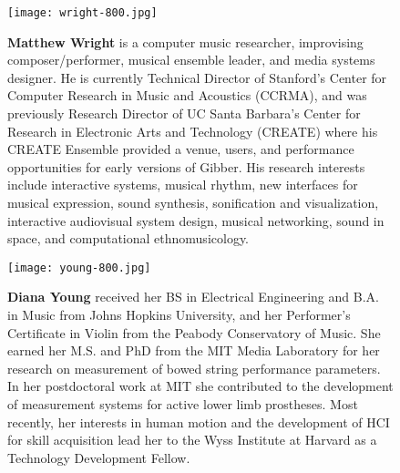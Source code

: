\begin{authbio}
\begin{figure}[H]
  \sidecaption[t]
  \texttt{[image: wright-800.jpg]}
  \caption{\textbf{Matthew Wright} is a computer music researcher, improvising composer/performer, musical ensemble leader, and media systems designer. He is currently Technical Director of Stanford's Center for Computer Research in Music and Acoustics (CCRMA), and was previously Research Director of UC Santa Barbara's Center for Research in Electronic Arts and Technology (CREATE) where his CREATE Ensemble provided a venue, users, and performance opportunities for early versions of Gibber. His research interests include interactive systems, musical rhythm, new interfaces for musical expression, sound synthesis, sonification and visualization, interactive audiovisual system design, musical networking, sound in space, and computational ethnomusicology.}
\end{figure}

\begin{figure}[H]
  \sidecaption[t]
  \texttt{[image: young-800.jpg]}
  \caption{\textbf{Diana Young} received her BS in Electrical Engineering and B.A. in Music from Johns Hopkins University, and her Performer's Certificate in Violin from the Peabody Conservatory of Music. She earned her M.S. and PhD from the MIT Media Laboratory for her research on measurement of bowed string performance parameters. In her postdoctoral work at MIT she contributed to the development of measurement systems for active lower limb prostheses. Most recently, her interests in human motion and the development of HCI for skill acquisition lead her to the Wyss Institute at Harvard as a Technology Development Fellow.}
  \end{figure}

%
%

\end{authbio}
